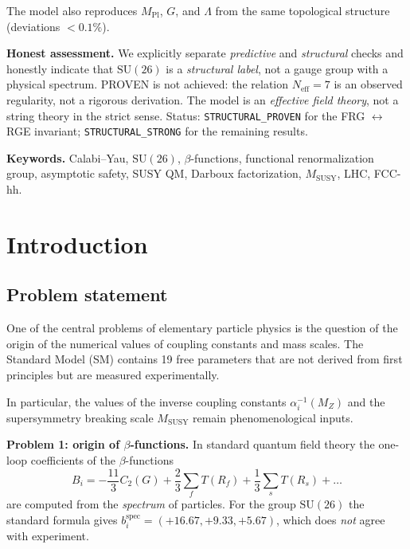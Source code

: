 \documentclass[11pt,a4paper]{article}
\newcommand{\SU}{\ensuremath{\mathrm{SU}}}
\newcommand{\MSUSY}{\ensuremath{M_{\text{SUSY}}}}
\theoremstyle{definition}
\begin{document}
The model also reproduces $M_{\text{Pl}}$, $G$, and $\Lambda$
from the same topological structure (deviations $< 0.1\%$).

\medskip\noindent
\textbf{Honest assessment.}
We explicitly separate \emph{predictive} and \emph{structural} checks
and honestly indicate that $\mathrm{SU}(26)$ is a \emph{structural label},
not a gauge group with a physical spectrum.
PROVEN is not achieved: the relation $N_{\text{eff}} = 7$ is an observed
regularity, not a rigorous derivation.
The model is an \emph{effective field theory}, not a string theory
in the strict sense.
Status: \texttt{STRUCTURAL\_PROVEN} for the FRG $\leftrightarrow$ RGE
invariant; \texttt{STRUCTURAL\_STRONG} for the remaining results.

\medskip\noindent
\textbf{Keywords.}
Calabi--Yau, $\mathrm{SU}(26)$, $\beta$-functions, functional
renormalization group, asymptotic safety, SUSY QM, Darboux
factorization, $M_{\text{SUSY}}$, LHC, FCC-hh.


\newpage
\tableofcontents
\newpage

\section{Introduction}
\label{sec:intro}

\subsection{Problem statement}

One of the central problems of elementary particle physics is
the question of the origin of the numerical values of coupling
constants and mass scales. The Standard Model (SM) contains 19 free
parameters that are not derived from first principles but
are measured experimentally.

In particular, the values of the inverse coupling constants
$\alpha_i^{-1}(M_Z)$ and the supersymmetry breaking scale $\MSUSY$
remain phenomenological inputs.

\medskip\noindent
\textbf{Problem 1: origin of $\beta$-functions.}
In standard quantum field theory the one-loop coefficients of the
$\beta$-functions
\begin{equation}
    B_i = -\frac{11}{3} C_2(G) + \frac{2}{3} \sum_f T(R_f)
    + \frac{1}{3} \sum_s T(R_s) + \ldots
    \label{eq:beta-standard}
\end{equation}
are computed from the \emph{spectrum} of particles. For the group $\SU(26)$
the standard formula gives $b_i^{\text{spec}} = (+16.67, +9.33, +5.67)$,
which does \emph{not} agree with experiment.
\end{document}
